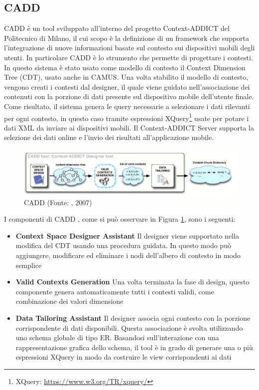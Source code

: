\subsection*{CADD}

CADD \cite{bolchini2007cadd} è un tool sviluppato all'interno del progetto Context-ADDICT del Politecnico di Milano, il cui scopo è la definizione di un framework che supporta l'integrazione di nuove informazioni basate sul contesto sui dispositivi mobili degli utenti. In particolare CADD è lo strumento che permette di progettare i contesti. In questo sistema è stato usato come modello di contesto il Context Dimension Tree (CDT), usato anche in CAMUS.  Una volta stabilito il modello di contesto, vengono creati i contesti dal designer, il quale viene guidato nell'associazione dei contenuti con la porzione di dati presente sul dispositivo mobile dell'utente finale. Come risultato, il sistema genera le query necessarie a selezionare i dati rilevanti per ogni contesto, in questo caso tramite espressioni XQuery\footnote{XQuery: \url{https://www.w3.org/TR/xquery/}} usate per potare i dati XML da inviare ai dispositivi mobili.
Il Context-ADDICT Server supporta la selezione dei dati online e l'invio dei risultati all'applicazione mobile. 

\begin{figure}[ht]
	\centering
	\includegraphics[width=\textwidth]{2-preliminari/Immagini/cadd.png}
	\caption[CADD]{CADD (Fonte: \cite{bolchini2007cadd}, 2007)}\label{fig:cadd}
\end{figure}

I componenti di CADD , come si può osservare in Figura  \ref{fig:cadd}, sono i seguenti:

\begin{itemize}
	\item \textbf{Context Space Designer Assistant}
	Il designer viene supportato nella modifica del CDT usando una procedura guidata. In questo modo può aggiungere, modificare ed eliminare i nodi dell'albero di contesto in modo semplice
	\item \textbf{Valid Contexts Generation}
	Una volta terminata la fase di design, questo componente genera automaticamente tutti i contesti validi, come combinazione dei valori dimensione
	\item \textbf{Data Tailoring Assistant}
	Il designer associa ogni contesto con la porzione corrispondente di dati disponibili. Questa associazione è svolta utilizzando uno schema globale di tipo ER. Basandosi sull'interazione con una rappresentazione grafica dello schema, il tool è in grado di generare una o più espressioni XQuery in modo da costruire le view corrispondenti ai dati
\end{itemize}


